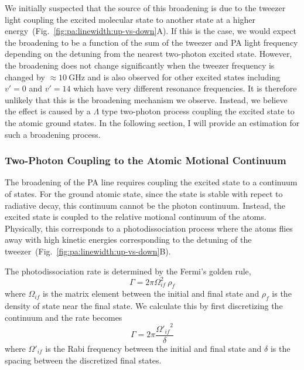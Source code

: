 We initially suspected that the source of this broadening is due to the tweezer light
coupling the excited molecular state to another state at
a higher energy~(Fig.~\ref{fig:pa:linewidth:up-vs-down}A).
If this is the case, we would expect the broadening to be a function of
the sum of the tweezer and PA light frequency depending on the detuning from the nearest
two-photon excited state.
However, the broadening does not change significantly when the tweezer frequency
is changed by $\approx\!10~\mathrm{GHz}$ and
is also observed for other excited states including $v'=0$ and $v'=14$
which have very different resonance frequencies.
It is therefore unlikely that this is the broadening mechanism we observe.
Instead, we believe the effect is caused by a $\Lambda$ type two-photon process
coupling the excited state to the atomic ground states.
In the following section, I will provide an estimation for such a broadening process.

\subsubsection{Two-Photon Coupling to the Atomic Motional Continuum}
\label{ch:pa:linewidth:two-photn-down}
The broadening of the PA line requires coupling the excited state to a continuum of states.
For the ground atomic state, since the state is stable with repect to radiative decay,
this continuum cannot be the photon continuum.
Instead, the excited state is coupled to the relative motional continuum of the atoms.
Physically, this corresponds to a photodissociation process
where the atoms flies away with high kinetic energies corresponding
to the detuning of the tweezer~(Fig.~\ref{fig:pa:linewidth:up-vs-down}B).

The photodissociation rate is determined by the Fermi's golden rule,
\[
  \Gamma=2\pi\Omega_{if}^2\ \rho_f
\]
where $\Omega_{if}$ is the matrix element between the initial and final state
and $\rho_f$ is the density of state near the final state.
We calculate this by first discretizing the continuum and the rate becomes
\[
  \Gamma=2\pi\frac{{\Omega'_{if}}^2}{\delta}
\]
where $\Omega'_{if}$ is the Rabi frequency between the initial and final state
and $\delta$ is the spacing between the discretized final states.

